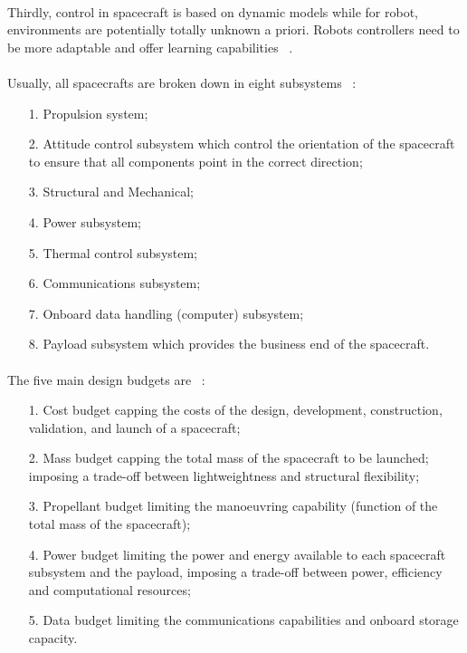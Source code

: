 \paragraph{}Thirdly, control in spacecraft is based on dynamic models while for robot, environments are potentially totally unknown a priori. Robots controllers need to be more adaptable and offer learning capabilities ~\cite{Ellery2003}.
\paragraph{}Usually, all spacecrafts are broken down in eight subsystems ~\cite{Ellery2003}: 
\begin{enumerate}
	\item[1.]{Propulsion system;}
	\item[2.]{Attitude control subsystem which control the orientation of the spacecraft to ensure that all components point in the correct direction;}
	\item[3.]{Structural and Mechanical;}
	\item[4.]{Power subsystem;}
	\item[5.]{Thermal control subsystem;}
	\item[6.]{Communications subsystem;}
	\item[7.]{Onboard data handling (computer) subsystem;}
	\item[8.]{Payload subsystem which provides the business end of the spacecraft.}
\end{enumerate}
\paragraph{}The five main design budgets are ~\cite{Ellery2003}: 
\begin{enumerate}
	\item[1.]{Cost budget capping the costs of the design, development, construction, validation, and launch of a spacecraft;}
	\item[2.]{Mass budget capping the total mass of the spacecraft to be launched; imposing a trade-off between lightweightness and structural flexibility; }
	\item[3.]{Propellant budget limiting the manoeuvring capability (function of the total mass of the spacecraft); }
	\item[4.]{Power budget limiting the power and energy available to each spacecraft subsystem and the payload, imposing a trade-off between power, efficiency and computational resources; }
	\item[5.]{Data budget limiting the communications capabilities and onboard storage capacity.}
\end{enumerate}

